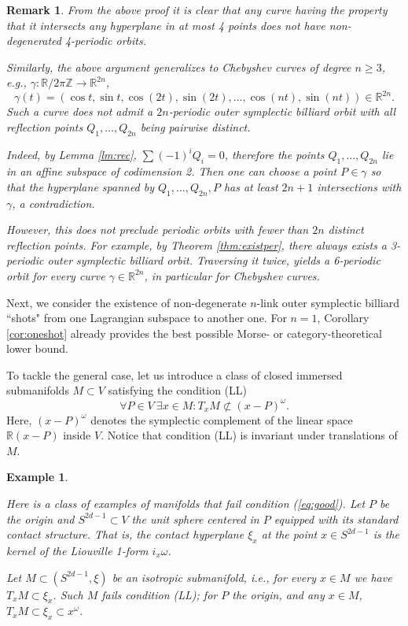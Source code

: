 \documentclass[12pt]{article}
\newtheorem{remark}[lemma]{Remark}
\newtheorem{example}[lemma]{Example}
\newcommand{\g}{{\gamma}}
\newcommand{\R}{{\mathbb R}}
\newcommand{\Z}{{\mathbb Z}}
\begin{document}
\begin{remark}
{\rm
From the above proof it is clear that any curve having the property that it intersects any hyperplane in at most 4 points does not have non-degenerated 4-periodic orbits.

Similarly, the above argument generalizes to Chebyshev curves of degree $n\geq3$, e.g., $\gamma:\R/{2\pi\Z}\to\R^{2n}$,
$$
\gamma(t)= (\cos t, \sin t, \cos (2t), \sin (2t),\ldots, \cos(nt), \sin(nt)) \in \R^{2n}.
$$
Such a curve does not admit a $2n$-periodic outer symplectic billiard orbit with all reflection points $Q_1,\ldots, Q_{2n}$ being pairwise distinct.

Indeed, by Lemma \ref{lm:rec}, $\sum (-1)^i Q_i =0$, therefore the points $Q_1,\ldots,Q_{2n}$ lie in an affine subspace of codimension 2. Then one can choose a point $P \in \g$ so that the hyperplane spanned by $Q_1,\ldots, Q_{2n}, P$ has at least $2n+1$ intersections with $\g$, a contradiction.

However, this does not preclude periodic orbits with fewer than $2n$ distinct reflection points. For example, by Theorem \ref{thm:existper}, there always exists a 3-periodic outer symplectic billiard orbit. Traversing it twice, yields a 6-periodic orbit for every curve $\g \in \R^{2n}$, in particular for Chebyshev curves. 
}
\end{remark}

Next, we consider the existence of non-degenerate $n$-link outer symplectic billiard ``shots" from one Lagrangian subspace to another one. For $n=1$, Corollary \ref{cor:oneshot} already provides the best possible Morse- or category-theoretical lower bound. 

To tackle the general case, let us introduce a class of closed immersed submanifolds $M \subset V$ satisfying the condition (LL)
\begin{equation} \label{eq:good}\tag{LL}
\forall P\in V\ \exists x\in M : T_x M \not\subset (x-P)^\omega.
\end{equation}
Here, $(x-P)^\omega$ denotes the symplectic complement of the linear space $\R(x-P)$ inside $V$. Notice that condition (LL) is invariant under translations of $M$. %

\begin{example} \label{ex:Leg}
{\rm Here is a class of examples of manifolds that fail condition (\ref{eq:good}). Let $P$ be the origin and $S^{2d-1} \subset V$ the unit sphere centered in $P$ equipped with its standard contact structure. That is, the contact hyperplane $\xi_x$ at the point $x \in S^{2d-1}$ is the kernel of the Liouville 1-form $i_x \omega$. 

Let $M \subset (S^{2d-1},\xi)$ be an isotropic submanifold, i.e., for every $x\in M$ we have $T_xM\subset\xi_x$. Such $M$ fails condition (LL); for $P$ the origin, and any $x\in M$, $T_x M \subset \xi_x \subset x^\omega$.
}
\end{example}
\end{document}
